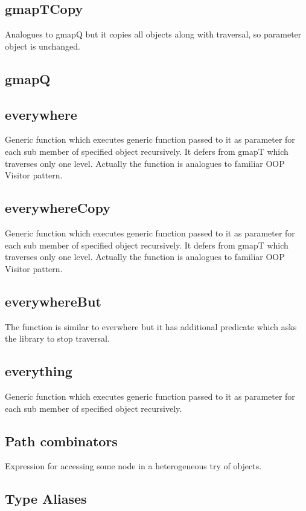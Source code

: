 \documentclass[a4paper]{article}
\begin{document}
\subsection{gmapTCopy}
Analogues to gmapQ but it copies all objects along with traversal, so parameter object is unchanged.
\subsection{gmapQ}

\subsection{everywhere}
Generic function which executes generic function passed to it as parameter for each sub member of specified object recursively.
It defers from gmapT which traverses only one level.
Actually the function is analogues to familiar OOP Visitor pattern.

\subsection{everywhereCopy}
Generic function which executes generic function passed to it as parameter for each sub member of specified object recursively.
It defers from gmapT which traverses only one level.
Actually the function is analogues to familiar OOP Visitor pattern.

\subsection{everywhereBut}

The function is similar to everwhere but it has additional predicate which asks the library to stop traversal.

\subsection{everything}

Generic function which executes generic function passed to it as parameter for each sub member of specified object recursively.

\subsection{Path combinators}

Expression for accessing some node in a heterogeneous try of objects.

\subsection{Type Aliases}
\end{document}
